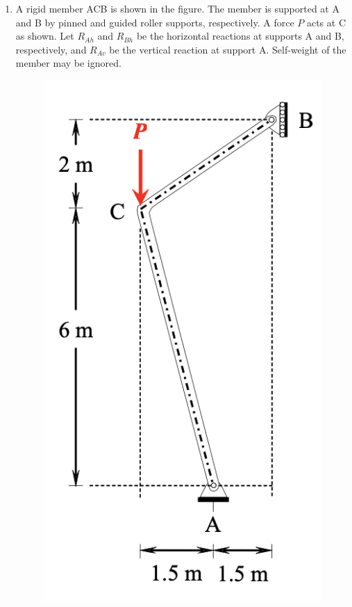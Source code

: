 \documentclass[journal]{IEEEtran}
\begin{document}
\begin{enumerate}[resume]
\begin{enumerate}
\end{enumerate}

\item A rigid member ACB is shown in the figure. The member is supported at A and B by pinned and guided roller supports, respectively. A force $P$ acts at C as shown. Let $R_{Ah}$ and $R_{Bh}$ be the horizontal reactions at supports A and B, respectively, and $R_{Av}$ be the vertical reaction at support A. Self-weight of the member may be ignored. \hfill {}

\begin{figure}[H]
    \centering
    \includegraphics[width=0.6\columnwidth]{figs/Q44.png} 
    \caption{}
    \label{fig:placeholder}
\end{figure}


\end{enumerate}
\end{document}
